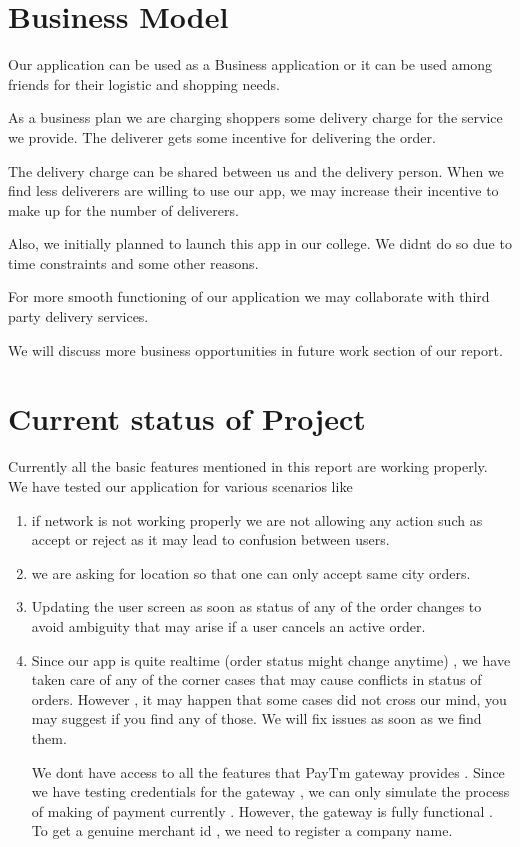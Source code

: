\documentclass{report}
\begin{document}
\chapter{Business Model}
Our application can be used as a Business application or it can be used among friends for their logistic and shopping  needs.

As a business plan we are charging shoppers some delivery charge for the service we provide. The deliverer gets some incentive for delivering the order.

The delivery charge can be shared between us and the delivery person. When we find less deliverers are willing to use our app, we may increase their incentive to make up for the number of deliverers. 

Also, we initially planned to launch this app in our college. We didn\textquotesingle t do so due to time constraints and some other reasons.

For more smooth functioning of our application we may collaborate with third party delivery services.

We will discuss more business opportunities in future work section of our report.


\chapter{Current status of Project}
Currently all the basic features mentioned in this report are working properly.\\

We have tested our application for various scenarios like
\begin{enumerate}[label=\roman*)]
\item  if network is not working properly we are not allowing any action such as accept or reject as it may lead to confusion between users.
\item we are asking for location so that one can only accept same city orders.
\item  Updating the user screen as soon as status of any of the order changes to avoid ambiguity that may arise if a user cancels an active order.
\item Since our app is quite realtime (order status might change anytime) , we have taken care of any of the corner cases that may cause conflicts in status of orders. However , it may happen that some cases did not cross our mind, you may suggest if you find any of those. We will fix issues as soon as we find them.

\par We don\textquotesingle t have access to all the features that PayTm gateway provides . Since we have testing credentials for the gateway , we can only simulate the process of making of payment currently  . However, the gateway is fully functional .
To get a genuine merchant id , we need to register a company name.

\end{enumerate}
\end{document}
